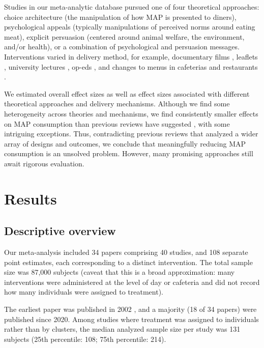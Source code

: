 \documentclass[sn-nature,referee,pdflatex]{sn-jnl}
\begin{document}
Studies in our meta-analytic database pursued one of four theoretical
approaches: choice architecture (the manipulation of how MAP is
presented to diners), psychological appeals (typically manipulations of
perceived norms around eating meat), explicit persuasion (centered
around animal welfare, the environment, and/or health), or a combination
of psychological and persuasion messages. Interventions varied in
delivery method, for example, documentary films
\citep{mathur2021effectiveness}, leaflets \citep{peacock2017},
university lectures \citep{jalil2023}, op-eds \citep{haile2021}, and
changes to menus in cafeterias \citep{andersson2021} and restaurants
\citep{coker2022, sparkman2021}.

We estimated overall effect sizes as well as effect sizes associated
with different theoretical approaches and delivery mechanisms. Although
we find some heterogeneity across theories and mechanisms, we find
consistently smaller effects on MAP consumption than previous reviews
have suggested
\citep{bianchi2018restructuring, byerly2018, chang2023, harguess2020, kwasny2022, mathur2021meta, meier2022, pandey2023},
with some intriguing exceptions. Thus, contradicting previous reviews
that analyzed a wider array of designs and outcomes, we conclude that
meaningfully reducing MAP consumption is an unsolved problem. However,
many promising approaches still await rigorous evaluation.

\section{Results}\label{sec2}

\subsection{Descriptive overview}\label{sec2.1}

Our meta-analysis included 34 papers comprising 40 studies, and 108
separate point estimates, each corresponding to a distinct intervention.
The total sample size was 87,000 subjects (caveat that this is a broad
approximation: many interventions were administered at the level of day
or cafeteria and did not record how many individuals were assigned to
treatment).

The earliest paper was published in 2002 \citep{allen2002}, and a
majority (18 of 34 papers) were published since 2020. Among studies
where treatment was assigned to individuals rather than by clusters, the
median analyzed sample size per study was 131 subjects (25th percentile:
108; 75th percentile: 214).
\end{document}
